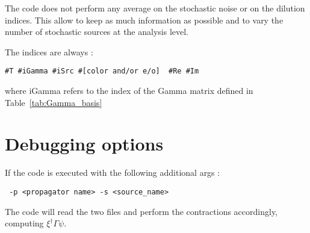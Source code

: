\documentclass[a4paper]{article}
\def\tab#1{Table~\ref{#1}}
\begin{document}
The code does not perform any average on the stochastic noise or on the
dilution indices.  This allow to keep as much information as possible
and to vary the number of stochastic sources at the analysis level.


The indices are always :

\begin{verbatim}
#T #iGamma #iSrc #[color and/or e/o]  #Re #Im
\end{verbatim}

where iGamma refers to the index of the Gamma matrix defined in \tab{tab:Gamma_basis}
\section{Debugging options}


If the code is executed with the following additional args :
\begin{verbatim}
 -p <propagator name> -s <source_name>
\end{verbatim}
The code will read the two files and perform the contractions
accordingly, computing $\xi^\dagger\Gamma \psi$.
\end{document}
